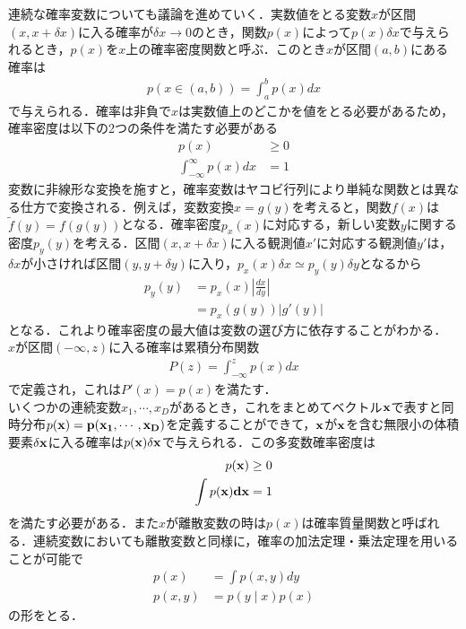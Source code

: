 \documentclass[a4j,11pt]{jsarticle}
\numberwithin{equation}{section}
\begin{document}
\subsubsection{}
連続な確率変数についても議論を進めていく．実数値をとる変数$x$が区間$(x,x+\delta x)$に入る確率が$\delta x \to 0$のとき，関数$p(x)$によって$p(x)\delta x$で与えられるとき，$p(x)$を$x$上の確率密度関数と呼ぶ．このとき$x$が区間$(a,b)$にある確率は
\begin{align}
p(x\in(a,b)) = \int_a^b p(x)dx
\end{align}
で与えられる．確率は非負で$x$は実数値上のどこかを値をとる必要があるため，確率密度は以下の2つの条件を満たす必要がある
\begin{align}
p(x)&\geq 0\\
\int_{-\infty}^{\infty}p(x)dx &= 1
\end{align}
変数に非線形な変換を施すと，確率変数はヤコビ行列により単純な関数とは異なる仕方で変換される．例えば，変数変換$x = g(y)$を考えると，関数$f(x)$は$\tilde f(y) = f(g(y))$となる．確率密度$p_x(x)$に対応する，新しい変数$y$に関する密度$p_y(y)$を考える．区間$(x,x+ \delta x)$に入る観測値$x'$に対応する観測値$y'$は，$\delta x$が小さければ区間$(y,y + \delta y)$に入り，$p_x(x)\delta x\simeq p_y(y)\delta y$となるから
\begin{equation}
\begin{split}
p_y(y) &= p_x(x)\left|\frac{dx}{dy}\right|\\
&=p_x(g(y))|g'(y)|
\end{split}
\end{equation}
となる．これより確率密度の最大値は変数の選び方に依存することがわかる．\\

$x$が区間$(-\infty,z)$に入る確率は累積分布関数
\begin{align}
P(z) = \int_{-\infty}^zp(x)dx
\end{align}
で定義され，これは$P'(x) = p(x)$を満たす．\\
いくつかの連続変数$x_1,\cdots,x_D$があるとき，これをまとめてベクトル$\bf x$で表すと同時分布$p(\bf x) = p(x_1,\cdots,x_D)$を定義することができて，$\bf x$が$\bf x$を含む無限小の体積要素$\delta \bf x$に入る確率は$p(\bf x)\delta \bf x$で与えられる．この多変数確率密度は
\begin{align}
p(\bf x) & \geq 0\\
\int p(\bf x)d {\bf x} &= 1
\end{align}
を満たす必要がある．また$x$が離散変数の時は$p(x)$は確率質量関数と呼ばれる．連続変数においても離散変数と同様に，確率の加法定理・乗法定理を用いることが可能で
\begin{align}
p(x) &= \int p(x,y) dy\\
p(x,y) &= p(y\mid x)p(x)
\end{align}
の形をとる．\\
\end{document}
